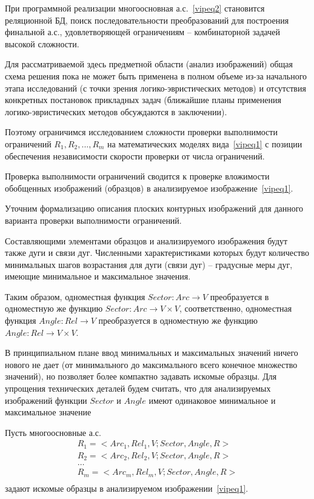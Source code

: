 При программной реализации многоосновная а.с.~\ref{vipeq2} становится реляционной БД, поиск последовательности преобразований для построения финальной а.с., удовлетворяющей ограничениям – комбинаторной задачей высокой сложности.

Для рассматриваемой здесь предметной области (анализ изображений) общая схема решения пока не может быть применена в полном объеме из-за начального этапа исследований (с точки зрения логико-эвристических методов) и отсутствия конкретных постановок прикладных задач (ближайшие планы применения логико-эвристических методов обсуждаются в заключении).

Поэтому ограничимся исследованием сложности проверки выполнимости ограничений $R_1,R_2,...,R_m$ на математических моделях вида~\ref{vipeq1} с позиции обеспечения независимости скорости проверки от числа ограничений.

Проверка выполнимости ограничений сводится к проверке вложимости обобщенных изображений (образцов) в анализируемое изображение~\ref{vipeq1}. 

Уточним формализацию описания плоских контурных изображений для данного варианта проверки выполнимости ограничений.

Составляющими элементами образцов и анализируемого изображения будут также дуги и связи дуг. Численными характеристиками которых будут количество минимальных шагов возрастания для дуги (связи дуг) -- градусные меры дуг, имеющие минимальное и максимальное значения.

Таким образом, одноместная функция $Sector: Arc \rightarrow V$ преобразуется в одноместную же функцию $Sector: Arc \rightarrow V \times V$, соответственно, одноместная функция $Angle: Rel \rightarrow V$ преобразуется в одноместную же функцию $Angle: Rel \rightarrow V \times V$.

\begin{remark}
В принципиальном плане ввод минимальных и максимальных значений ничего нового не дает (от минимального до максимального всего конечное множество значений), но позволяет более компактно задавать искомые образцы. Для упрощения технических деталей будем считать, что для анализируемых изображений функции $Sector$ и $Angle$ имеют одинаковое минимальное и максимальное значение
\end{remark}

Пусть многоосновные а.с.
\begin{equation}
	\begin{array}{c}
	R_1=<Arc_1, Rel_1, V; Sector, Angle, R> \\
	R_2=<Arc_2, Rel_2, V; Sector, Angle, R> \\
	\dots\\
	R_m=<Arc_m, Rel_m, V; Sector, Angle, R> \\
	\end{array}
	\label{vipeq3}
\end{equation}
задают искомые образцы в анализируемом изображении~\ref{vipeq1}.

